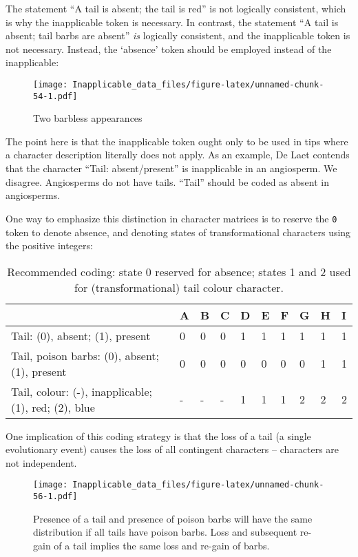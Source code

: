 \documentclass[]{book}
\theoremstyle{definition}
\theoremstyle{definition}
\theoremstyle{definition}
\theoremstyle{remark}
\begin{document}
The statement ``A tail is absent; the tail is red'' is not logically
consistent, which is why the inapplicable token is necessary. In
contrast, the statement ``A tail is absent; tail barbs are absent''
\emph{is} logically consistent, and the inapplicable token is not
necessary. Instead, the `absence' token should be employed instead of
the inapplicable:

\begin{figure}
\centering
\texttt{[image: Inapplicable\_data\_files/figure-latex/unnamed-chunk-54-1.pdf]}
\caption{\label{fig:unnamed-chunk-54}Two barbless appearances}
\end{figure}

The point here is that the inapplicable token ought only to be used in
tips where a character description literally does not apply. As an
example, De Laet \citeyearpar{DeLaet2017} contends that the character
``Tail: absent/present'' is inapplicable in an angiosperm. We disagree.
Angiosperms do not have tails. ``Tail'' should be coded as absent in
angiosperms.

One way to emphasize this distinction in character matrices is to
reserve the \texttt{0} token to denote absence, and denoting states of
transformational characters using the positive integers:

\begin{table}

\caption{\label{tab:unnamed-chunk-55}Recommended coding: state 0 reserved for absence; states 1 and 2 used for (transformational) tail colour character.}
\centering
\begin{tabular}[t]{l|l|l|l|l|l|l|l|l|l}
\hline
  & A & B & C & D & E & F & G & H & I\\
\hline
Tail: (0), absent; (1), present & 0 & 0 & 0 & 1 & 1 & 1 & 1 & 1 & 1\\
\hline
Tail, poison barbs: (0), absent; (1), present & 0 & 0 & 0 & 0 & 0 & 0 & 0 & 1 & 1\\
\hline
Tail, colour: (-), inapplicable; (1), red; (2), blue & - & - & - & 1 & 1 & 1 & 2 & 2 & 2\\
\hline
\end{tabular}
\end{table}

One implication of this coding strategy is that the loss of a tail (a
single evolutionary event) causes the loss of all contingent characters
-- characters are not independent.

\begin{figure}
\centering
\texttt{[image: Inapplicable\_data\_files/figure-latex/unnamed-chunk-56-1.pdf]}
\caption{\label{fig:unnamed-chunk-56}Presence of a tail and presence of
poison barbs will have the same distribution if all tails have poison
barbs. Loss and subsequent re-gain of a tail implies the same loss and
re-gain of barbs.}
\end{figure}
\end{document}
